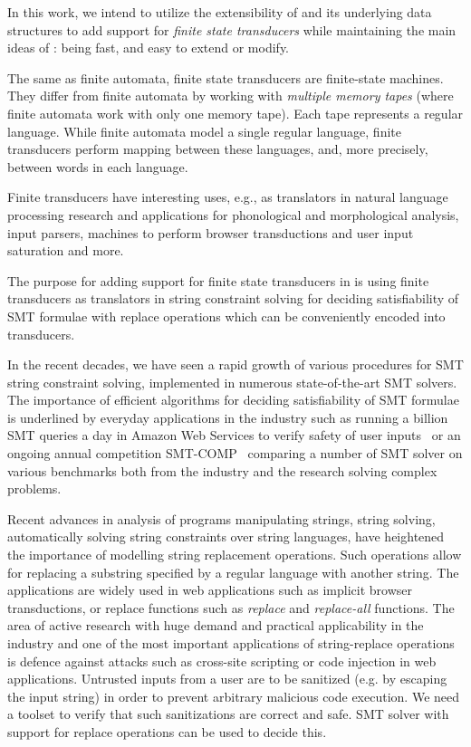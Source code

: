 In this work, we intend to utilize the extensibility of \mata and its underlying data structures to add support for \emph{finite state transducers} while maintaining the main ideas of \mata: being fast, and easy to extend or modify.

The same as finite automata, finite state transducers are finite-state machines.
They differ from finite automata by working with \emph{multiple memory tapes} (where finite automata work with only one memory tape).
Each tape represents a regular language.
While finite automata model a single regular language, finite transducers perform mapping between these languages, and, more precisely, between words in each language.

Finite transducers have interesting uses, e.g., as translators in natural language processing research and applications for phonological and morphological analysis, input parsers, machines to perform browser transductions and user input saturation and more.

The purpose for adding support for finite state transducers in \mata is using finite transducers as translators in string constraint solving for deciding satisfiability of SMT formulae with replace operations which can be conveniently encoded into transducers.

In the recent decades, we have seen a rapid growth of various procedures for SMT string constraint solving, implemented in numerous state-of-the-art SMT solvers.
The importance of efficient algorithms for deciding satisfiability of SMT formulae is underlined by everyday applications in the industry such as running a billion SMT queries a day in Amazon Web Services to verify safety of user inputs~\cite{Rungta2022} or an ongoing annual competition SMT-COMP~\cite{smt_comp} comparing a number of SMT solver on various benchmarks both from the industry and the research solving complex problems.

Recent advances in analysis of programs manipulating strings, string solving, automatically solving string constraints over string languages, have heightened the importance of modelling string replacement operations.
Such operations allow for replacing a substring specified by a regular language with another string.
The applications are widely used in web applications such as implicit browser transductions, or replace functions such as \emph{replace} and \emph{replace-all} functions.
The area of active research with huge demand and practical applicability in the industry and one of the most important applications of string-replace operations is defence against attacks such as cross-site scripting or code injection in web applications.
Untrusted inputs from a user are to be sanitized (e.g. by escaping the input string) in order to prevent arbitrary malicious code execution.
We need a toolset to verify that such sanitizations are correct and safe.
SMT solver with support for replace operations can be used to decide this.

